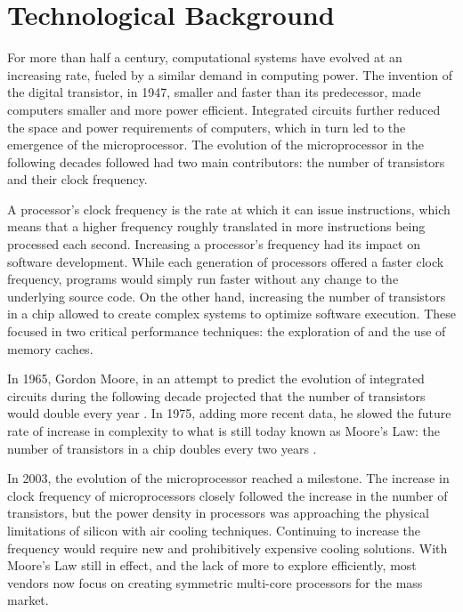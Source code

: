 \documentclass[../thesis]{subfiles}
\begin{document}
	\chapter{Technological Background}
	\label{chp:techbg}

	For more than half a century, computational systems have evolved at an increasing rate, fueled by a similar demand in computing power. The invention of the digital transistor, in 1947, smaller and faster than its predecessor, made computers smaller and more power efficient. Integrated circuits further reduced the space and power requirements of computers, which in turn led to the emergence of the microprocessor. The evolution of the microprocessor in the following decades followed had two main contributors: the number of transistors and their clock frequency.

	A processor's clock frequency is the rate at which it can issue instructions, which means that a higher frequency roughly translated in more instructions being processed each second. Increasing a processor's frequency had its impact on software development. While each generation of processors offered a faster clock frequency, programs would simply run faster without any change to the underlying source code. On the other hand, increasing the number of transistors in a chip allowed to create complex systems to optimize software execution. These focused in two critical performance techniques: the exploration of \ilp and the use of memory caches.

	In 1965, Gordon Moore, in an attempt to predict the evolution of integrated circuits during the following decade projected that the number of transistors would double every year \cite{Moore:1965}. In 1975, adding more recent data, he slowed the future rate of increase in complexity to what is still today known as Moore's Law: the number of transistors in a chip doubles every two years \cite{Moore:1975,ComputerHistory:Moore}.

	In 2003, the evolution of the microprocessor reached a milestone. The increase in clock frequency of microprocessors closely followed the increase in the number of transistors, but the power density in processors was approaching the physical limitations of silicon with air cooling techniques. Continuing to increase the frequency would require new and prohibitively expensive cooling solutions. With Moore's Law still in effect, and the lack of more \ilp to explore efficiently, most vendors now focus on creating symmetric multi-core processors for the mass market.
\end{document}
